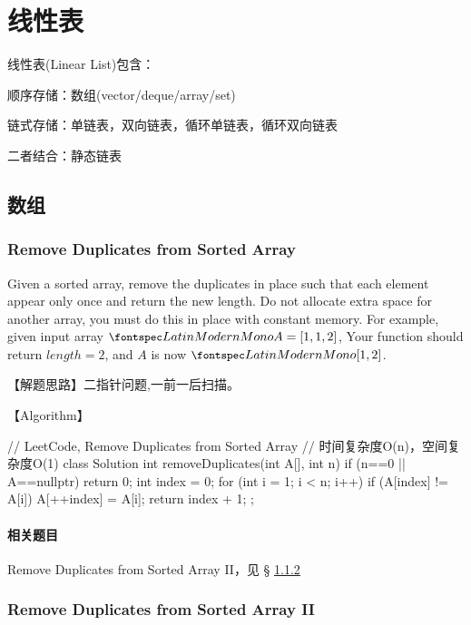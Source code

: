 \chapter{线性表}
线性表(Linear List)包含：
\begindot
\item 顺序存储：数组(vector/deque/array/set)
\item 链式存储：单链表，双向链表，循环单链表，循环双向链表
\item 二者结合：静态链表
\myenddot

\section{数组} %


\subsection{Remove Duplicates from Sorted Array}
\label{sec:remove-duplicates-from-sorted-array}

Given a sorted array, remove the duplicates in place such that each element
appear only once and return the new length.
Do not allocate extra space for another array, you must do this in place with
constant memory.
For example, given input array $\code{A = [1,1,2]}$,
Your function should return $length = 2$, and $A$ is now $\code{[1,2]}$.

【解题思路】二指针问题,一前一后扫描。

【Algorithm】
\begin{Code}
	// LeetCode, Remove Duplicates from Sorted Array
	// 时间复杂度O(n)，空间复杂度O(1)
	class Solution {
		int removeDuplicates(int A[], int n) {
			if (n==0 || A==nullptr) return 0;
			int index = 0;
			for (int i = 1; i < n; i++)
				if (A[index] != A[i])
                    A[++index] = A[i];
			return index + 1;
		}
	};
\end{Code}

\subsubsection{相关题目}

\begindot
\item Remove Duplicates from Sorted Array II，见 \S
\ref{sec:remove-duplicates-from-sorted-array-ii}
\myenddot


\subsection{Remove Duplicates from Sorted Array II}
\label{sec:remove-duplicates-from-sorted-array-ii}



